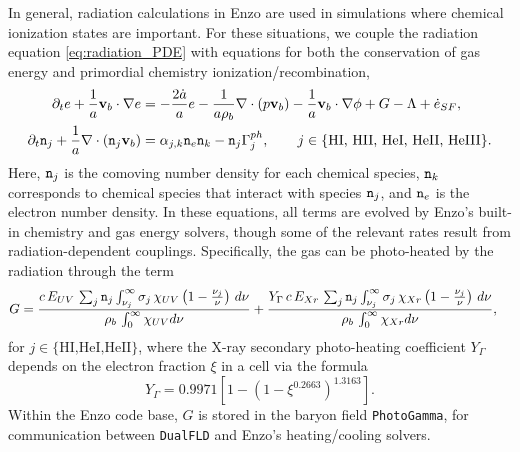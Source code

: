 \documentclass[letterpaper,10pt]{article}
\renewcommand{\(}{\left(}
\renewcommand{\)}{\right)}
\newcommand{\vb}{{\bf v}_b}
\newcommand{\rhob}{\rho_b}
\newcommand{\mn}{{\tt n}}
\begin{document}
In general, radiation calculations in Enzo are used in simulations
where chemical ionization states are important.  For these situations, 
we couple the radiation equation \eqref{eq:radiation_PDE} with
equations for both the conservation of gas energy and primordial
chemistry ionization/recombination, 
\begin{align}
  \label{eq:cons_energy}
  \partial_t e + \frac1a\vb\cdot\nabla e &=
    - \frac{2\dot{a}}{a}e
    - \frac{1}{a\rhob}\nabla\cdot\left(p\vb\right) 
    - \frac1a\vb\cdot\nabla\phi + G - \Lambda  + \dot{e}_{SF}, \\
  \label{eq:chemical_ionization}
  \partial_t \mn_j + \frac{1}{a}\nabla\cdot\(\mn_j\vb\) &=
    \alpha_{j,k} \mn_e \mn_k - \mn_j \Gamma_{j}^{ph}, \qquad
    j\in\{\text{HI, HII, HeI, HeII, HeIII}\}. 
\end{align}
Here, $\mn_{j}$ is the comoving number density for each chemical
species, $\mn_k$ corresponds to chemical species that interact with
species $\mn_j$, and $\mn_e$ is the electron number density.  In these
equations, all terms are evolved by Enzo's built-in chemistry and gas
energy solvers, though some of the relevant rates result from
radiation-dependent couplings. Specifically, the gas can be
photo-heated by the radiation through the term 
\begin{align}
  \label{eq:G}
  G &= \frac{c\,E_{UV}\,\sum_{j} \mn_j
    \int_{\nu_{j}}^{\infty} \sigma_{j}\, \chi_{UV}
    \left(1-\frac{\nu_{j}}{\nu}\right)\,
    d\nu}{\rhob\,\int_{0}^{\infty} \chi_{UV} d\nu}
  + \frac{Y_{\Gamma}\,c\,E_{Xr}\,\sum_{j} \mn_j
    \int_{\nu_{j}}^{\infty} \sigma_{j}\, \chi_{Xr}
    \left(1-\frac{\nu_{j}}{\nu}\right)\,
    d\nu}{\rhob\,\int_{0}^{\infty} \chi_{Xr} d\nu},
\end{align}
for $j\in\{\text{HI,HeI,HeII}\}$, where the X-ray secondary
photo-heating coefficient $Y_{\Gamma}$ depends on the electron
fraction $\xi$ in a cell via the formula 
\begin{equation}
\label{eq:Ygamma}
  Y_{\Gamma} = 0.9971 \left[1 - \left(1-\xi^{0.2663}\right)^{1.3163}\right].
\end{equation}
Within the Enzo code base, $G$ is stored in the baryon field
{\tt PhotoGamma}, for communication between {\tt DualFLD} and Enzo's
heating/cooling solvers.
\end{document}
